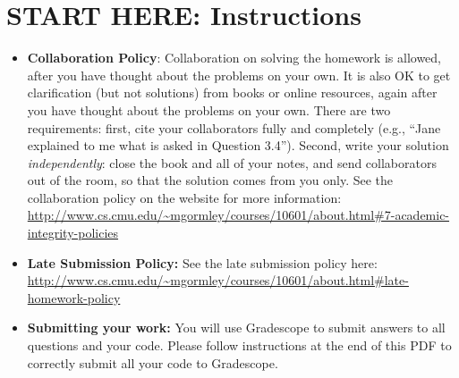 \documentclass[11pt]{exam}
\numberwithin{equation}{section} %
\numberwithin{figure}{section} %
\numberwithin{table}{section} %
\begin{document}
\section*{START HERE: Instructions}
\begin{itemize}

\item \textbf{Collaboration Policy}: Collaboration on solving the homework is allowed, after you have thought about the problems on your own. It is also OK to get clarification (but not solutions) from books or online resources, again after you have thought about the problems on your own. There are two requirements: first, cite your collaborators fully and completely (e.g., ``Jane explained to me what is asked in Question 3.4''). Second, write your solution {\em independently}: close the book and all of your notes, and send collaborators out of the room, so that the solution comes from you only.  See the collaboration policy on the website for more information: \url{http://www.cs.cmu.edu/~mgormley/courses/10601/about.html#7-academic-integrity-policies}
\item\textbf{Late Submission Policy:} See the late submission policy
  here:
  \url{http://www.cs.cmu.edu/~mgormley/courses/10601/about.html#late-homework-policy}

\item\textbf{Submitting your work:} You will use Gradescope to submit
  answers to all questions and your code. Please
  follow instructions at the end of this PDF to correctly submit all your code to Gradescope.

  \begin{itemize}
    

    

\end{itemize}
\end{itemize}
\end{document}
